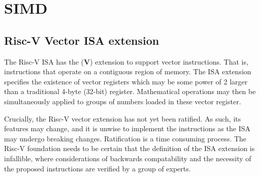 \documentclass[a4paper,8pt]{report}
\begin{document}




% 






\section{SIMD}
\subsection{Risc-V Vector ISA extension}
The Risc-V ISA has the (\textbf{V}) extension to support vector instructions.
That is, instructions that operate on a contiguous region of memory. The ISA
extension specifies the existence of vector registers which may be some power of
2 larger than a traditional 4-byte (32-bit) register. Mathematical operations
may then be simultaneously applied to groups of numbers loaded in these vector
register.

Crucially, the Risc-V vector extension has not yet been ratified. As such, its
features may change, and it is unwise to implement the instructions as the ISA
may undergo breaking changes. Ratification is a time consuming process. The
Risc-V foundation needs to be certain that the definition of the ISA extension
is infallible, where considerations of backwards compatability and the necessity of
the proposed instructions are verified by a group of experts.
\end{document}
